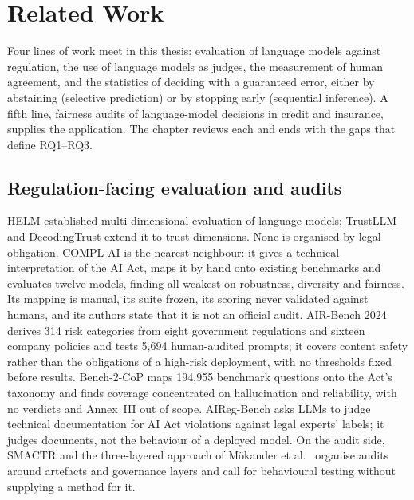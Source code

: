 \chapter{Related Work}
\label{ch:sota}

Four lines of work meet in this thesis: evaluation of language models against regulation, the use of language models as judges, the measurement of human agreement, and the statistics of deciding with a guaranteed error, either by abstaining (selective prediction) or by stopping early (sequential inference). A fifth line, fairness audits of language-model decisions in credit and insurance, supplies the application. The chapter reviews each and ends with the gaps that define RQ1--RQ3.

\section{Regulation-facing evaluation and audits}
HELM \citep{helm} established multi-dimensional evaluation of language models; TrustLLM \citep{trustllm} and DecodingTrust \citep{decodingtrust} extend it to trust dimensions. None is organised by legal obligation. COMPL-AI \citep{complai} is the nearest neighbour: it gives a technical interpretation of the AI Act, maps it by hand onto existing benchmarks and evaluates twelve models, finding all weakest on robustness, diversity and fairness. Its mapping is manual, its suite frozen, its scoring never validated against humans, and its authors state that it is not an official audit. AIR-Bench 2024 \citep{airbench} derives 314 risk categories from eight government regulations and sixteen company policies and tests 5{,}694 human-audited prompts; it covers content safety rather than the obligations of a high-risk deployment, with no thresholds fixed before results. Bench-2-CoP \citep{bench2cop} maps 194{,}955 benchmark questions onto the Act's taxonomy and finds coverage concentrated on hallucination and reliability, with no verdicts and Annex~III out of scope. AIReg-Bench \citep{airegbench} asks LLMs to judge technical documentation for AI Act violations against legal experts' labels; it judges documents, not the behaviour of a deployed model. On the audit side, SMACTR \citep{smactr} and the three-layered approach of M\"okander et al.\ \citep{mokander} organise audits around artefacts and governance layers and call for behavioural testing without supplying a method for it.

